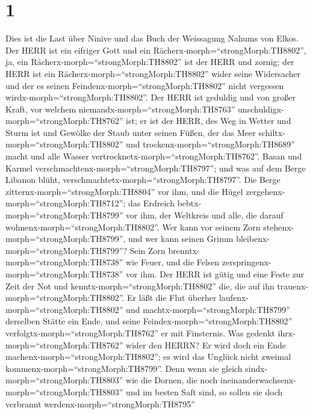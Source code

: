 \hypertarget{section}{%
\section{1}\label{section}}

 Dies ist die Last über Ninive und das Buch der Weissagung
Nahums von Elkos.  Der HERR ist ein eifriger Gott und ein
Rächerx-morph=``strongMorph:TH8802'', ja, ein
Rächerx-morph=``strongMorph:TH8802'' ist der HERR und zornig; der HERR
ist ein Rächerx-morph=``strongMorph:TH8802'' wider seine Widersacher und
der es seinen Feindenx-morph=``strongMorph:TH8802'' nicht vergessen
wirdx-morph=``strongMorph:TH8802''.  Der HERR ist geduldig
und von großer Kraft, vor welchem niemandx-morph=``strongMorph:TH8763''
unschuldigx-morph=``strongMorph:TH8762'' ist; er ist der HERR, des Weg
in Wetter und Sturm ist und Gewölke der Staub unter seinen Füßen,
 der das Meer schiltx-morph=``strongMorph:TH8802'' und
trockenx-morph=``strongMorph:TH8689'' macht und alle Wasser
vertrocknetx-morph=``strongMorph:TH8762''. Basan und Karmel
verschmachtenx-morph=``strongMorph:TH8797''; und was auf dem Berge
Libanon blüht, verschmachtetx-morph=``strongMorph:TH8797''. 
Die Berge zitternx-morph=``strongMorph:TH8804'' vor ihm, und die Hügel
zergehenx-morph=``strongMorph:TH8712''; das Erdreich
bebtx-morph=``strongMorph:TH8799'' vor ihm, der Weltkreis und alle, die
darauf wohnenx-morph=``strongMorph:TH8802''.  Wer kann vor
seinem Zorn stehenx-morph=``strongMorph:TH8799'', und wer kann seinen
Grimm bleibenx-morph=``strongMorph:TH8799''? Sein Zorn
brenntx-morph=``strongMorph:TH8738'' wie Feuer, und die Felsen
zerspringenx-morph=``strongMorph:TH8738'' vor ihm.  Der HERR
ist gütig und eine Feste zur Zeit der Not und
kenntx-morph=``strongMorph:TH8802'' die, die auf ihn
trauenx-morph=``strongMorph:TH8802''.  Er läßt die Flut
überher laufenx-morph=``strongMorph:TH8802'' und
machtx-morph=``strongMorph:TH8799'' derselben Stätte ein Ende, und seine
Feindex-morph=``strongMorph:TH8802''
verfolgtx-morph=``strongMorph:TH8762'' er mit Finsternis. 
Was gedenkt ihrx-morph=``strongMorph:TH8762'' wider den HERRN? Er wird
doch ein Ende machenx-morph=``strongMorph:TH8802''; es wird das Unglück
nicht zweimal kommenx-morph=``strongMorph:TH8799''.  Denn
wenn sie gleich sindx-morph=``strongMorph:TH8803'' wie die Dornen, die
noch ineinanderwachsenx-morph=``strongMorph:TH8803'' und im besten Saft
sind, so sollen sie doch verbrannt werdenx-morph=``strongMorph:TH8795''
